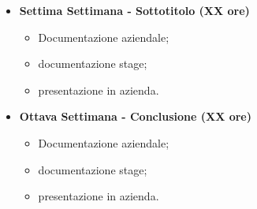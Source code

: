 {\begin{itemize}
\begin{itemize}
\begin{itemize}
            	\item connessione alla rete;
            	\item creare transazioni;
            	\item firmare transazioni;
            	\item diventare parte della rete;
            	\item connessione con altre reti.
            \end{itemize}
        \end{itemize}
        \item \textbf{Settima Settimana - Sottotitolo (XX ore)} 
        \begin{itemize}
            \item Documentazione aziendale;
            \item documentazione stage;
            \item presentazione in azienda.
        \end{itemize}
        \item \textbf{Ottava Settimana - Conclusione (XX ore)} 
        \begin{itemize}
            \item Documentazione aziendale;
            \item documentazione stage;
            \item presentazione in azienda.
        \end{itemize}
    \end{itemize}
}

\newcommand{\totaleOre}{}

\newcommand{\obiettiviObbligatori}{
	 \item \underline{\textit{O01}}: primo obiettivo;
	 \item \underline{\textit{O02}}: secondo obiettivo;
	 \item \underline{\textit{O03}}: terzo obiettivo;
}

\newcommand{\obiettiviDesiderabili}{
	 \item \underline{\textit{D01}}: primo obiettivo;
	 \item \underline{\textit{D02}}: secondo obiettivo;
}

\newcommand{\obiettiviFacoltativi}{
	 \item \underline{\textit{F01}}: primo obiettivo;
	 \item \underline{\textit{F02}}: secondo obiettivo;
	 \item \underline{\textit{F03}}: terzo obiettivo;
}
